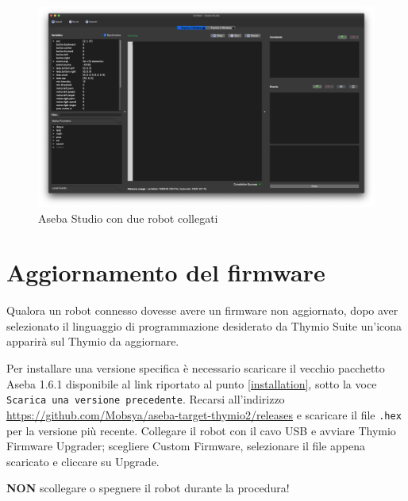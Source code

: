 \documentclass[12pt]{article}
\begin{document}
	\begin{figure}[H]
		\includegraphics[width=\textwidth]{img/multiRobot.png}
		\caption{Aseba Studio con due robot collegati}
		\label{multiRobot}
	\end{figure}
	

		
\section{Aggiornamento del firmware}

	Qualora un robot connesso dovesse avere un firmware non aggiornato, dopo aver selezionato il linguaggio di programmazione desiderato da Thymio Suite un'icona apparirà sul Thymio da aggiornare.
	
	Per installare una versione specifica è necessario scaricare il vecchio pacchetto Aseba 1.6.1 disponibile al link riportato al punto \ref{installation}, sotto la voce \texttt{Scarica una versione precedente}.	
	Recarsi all'indirizzo \url{https://github.com/Mobsya/aseba-target-thymio2/releases} e scaricare il file \texttt{.hex} per la versione più recente. Collegare il robot con il cavo USB e avviare Thymio Firmware Upgrader; scegliere Custom Firmware, selezionare il file appena scaricato e cliccare su Upgrade. 
	
	\textbf{NON} scollegare o spegnere il robot durante la procedura!
	
\end{document}
